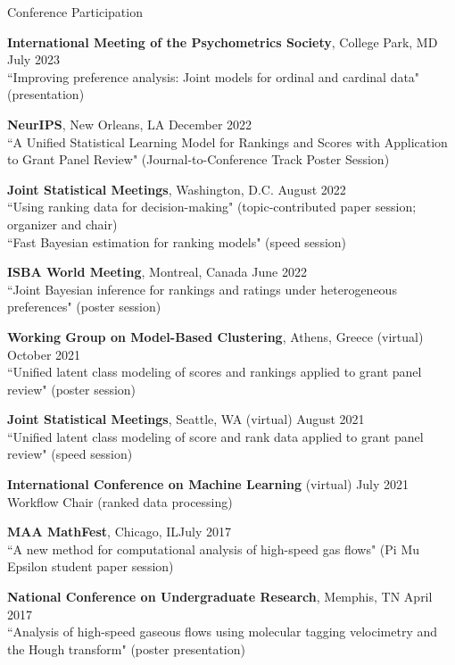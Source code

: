 \documentclass{resume} %
\begin{document}
\begin{rSection}{Conference Participation}

\textbf{International Meeting of the Psychometrics Society}, College Park, MD \hfill{July 2023}\\
``Improving preference analysis: Joint models for ordinal and cardinal data" (presentation)

\textbf{NeurIPS}, New Orleans, LA \hfill {December 2022}\\
``A Unified Statistical Learning Model for Rankings and Scores with Application to Grant Panel Review" (Journal-to-Conference Track Poster Session)

\textbf{Joint Statistical Meetings}, Washington, D.C. \hfill {August 2022}\\
``Using ranking data for decision-making" (topic-contributed paper session; organizer and chair)\\
``Fast Bayesian estimation for ranking models" (speed session)

\textbf{ISBA World Meeting}, Montreal, Canada \hfill {June 2022}\\
``Joint Bayesian inference for rankings and ratings under heterogeneous preferences" (poster session)

\textbf{Working Group on Model-Based Clustering}, Athens, Greece (virtual)  \hfill {October 2021}\\
``Unified latent class modeling of scores and rankings applied to grant panel review" (poster session)

\textbf{Joint Statistical Meetings}, Seattle, WA (virtual) \hfill {August 2021}\\
``Unified latent class modeling of score and rank data applied to grant panel review" (speed session)

\textbf{International Conference on Machine Learning} (virtual) \hfill {July 2021}\\
Workflow Chair (ranked data processing)

\textbf{MAA MathFest}, Chicago, IL\hfill {July 2017}\\
``A new method for computational analysis of high-speed gas flows" (Pi Mu Epsilon student paper session)

\textbf{National Conference on Undergraduate Research}, Memphis, TN \hfill {April 2017}\\
``Analysis of high-speed gaseous flows using molecular tagging velocimetry and the Hough transform" (poster presentation)
\end{rSection}
\end{document}
